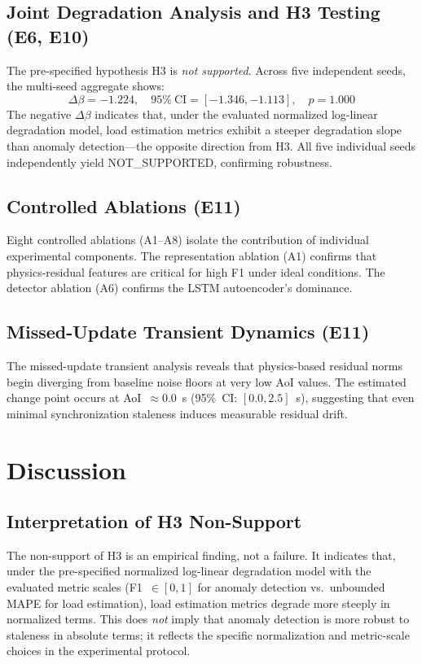 \documentclass[journal]{IEEEtran}
\newcommand{\dbeta}{\Delta\beta}
\begin{document}
\subsection{Joint Degradation Analysis and H3 Testing (E6, E10)}
The pre-specified hypothesis H3 is \emph{not supported}. Across five
independent seeds, the multi-seed aggregate shows:
\begin{equation}
    \dbeta = -1.224, \quad 95\%~\text{CI} = [-1.346, -1.113], \quad p = 1.000
    \label{eq:h3_result}
\end{equation}
The negative $\dbeta$ indicates that, under the evaluated normalized
log-linear degradation model, load estimation metrics exhibit a steeper
degradation slope than anomaly detection---the opposite direction from H3.
All five individual seeds independently yield NOT\_SUPPORTED, confirming
robustness.





\subsection{Controlled Ablations (E11)}
Eight controlled ablations (A1--A8) isolate the contribution of individual
experimental components. The representation ablation (A1) confirms that
physics-residual features are critical for high F1 under ideal conditions.
The detector ablation (A6) confirms the LSTM autoencoder's dominance.



\subsection{Missed-Update Transient Dynamics (E11)}
The missed-update transient analysis reveals that physics-based residual
norms begin diverging from baseline noise floors at very low AoI values.
The estimated change point occurs at AoI~$\approx 0.0$~s (95\%~CI:
$[0.0, 2.5]$~s), suggesting that even minimal synchronization staleness
induces measurable residual drift.


\section{Discussion}
\label{sec:discussion}

\subsection{Interpretation of H3 Non-Support}
The non-support of H3 is an empirical finding, not a failure. It indicates
that, under the pre-specified normalized log-linear degradation model with
the evaluated metric scales (F1~$\in [0,1]$ for anomaly detection vs.\
unbounded MAPE for load estimation), load estimation metrics degrade more
steeply in normalized terms. This does \emph{not} imply that anomaly
detection is more robust to staleness in absolute terms; it reflects the
specific normalization and metric-scale choices in the experimental protocol.
\end{document}
